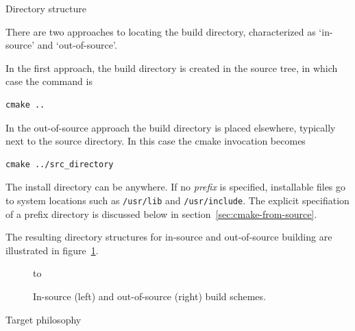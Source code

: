  {Directory structure}

There are two approaches to locating the build directory,
characterized as `in-source' and `out-of-source'.

In the first approach,  the build directory is created in the source tree,
in which case the  command is
\begin{lstlisting}[language=shell]
cmake ..
\end{lstlisting}

In the out-of-source approach the build  directory is placed elsewhere,
typically next to the source directory. In this case
the cmake invocation becomes
\begin{lstlisting}[language=shell]
cmake ../src_directory
\end{lstlisting}

The install directory can be anywhere.
If no \emph{prefix}
is specified, installable files go to system locations
such as \lstinline[language=shell]{/usr/lib} and \lstinline[language=shell]{/usr/include}.
The explicit specifiation of a prefix directory
is discussed below in section~\ref{sec:cmake-from-source}.

The resulting directory structures
for in-source and out-of-source building
are illustrated in figure~\ref{fig:cmake-buildinstall}.

\begin{figure}[ht]
  \hbox to \textwidth\bgroup
  \begin{minipage}{.45\textwidth}
  \end{minipage}
  \hss
  \begin{minipage}{.45\textwidth}
  \end{minipage}
  \egroup
  \caption{In-source (left) and out-of-source (right) build schemes.}
  \label{fig:cmake-buildinstall}
\end{figure}

 {Target philosophy}

